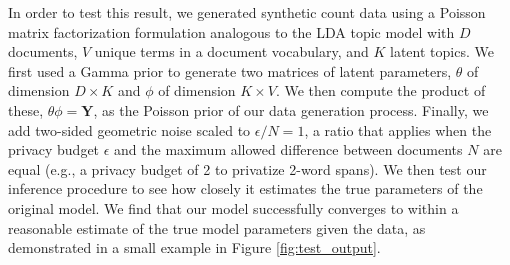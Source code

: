 \documentclass[letterpaper]{article}
\newcommand{\Yten}{\pmb{Y}}
\begin{document}
  In order to test this result, we generated synthetic count data using a
  Poisson matrix factorization formulation analogous to the LDA topic model
  \citep{blei2003latent} with $D$ documents, $V$ unique terms in a document
  vocabulary, and $K$ latent topics. We first used a Gamma prior to generate two
  matrices of latent parameters, $\theta$ of dimension $D \times K$ and $\phi$
  of dimension $K \times V$. We then compute the product of these, $\theta \phi
  = \Yten$, as the Poisson prior of our data generation process. Finally, we add
  two-sided geometric noise scaled to $\epsilon / N = 1$, a ratio that applies
  when the privacy budget $\epsilon$ and the maximum allowed difference between
  documents $N$ are equal (e.g., a privacy budget of 2 to privatize 2-word
  spans). We then test our inference procedure to see how closely it estimates
  the true parameters of the original model. We find that our model successfully
  converges to within a reasonable estimate of the true model parameters given
  the data, as demonstrated in a small example in Figure \ref{fig:test_output}.
  
\end{document}

